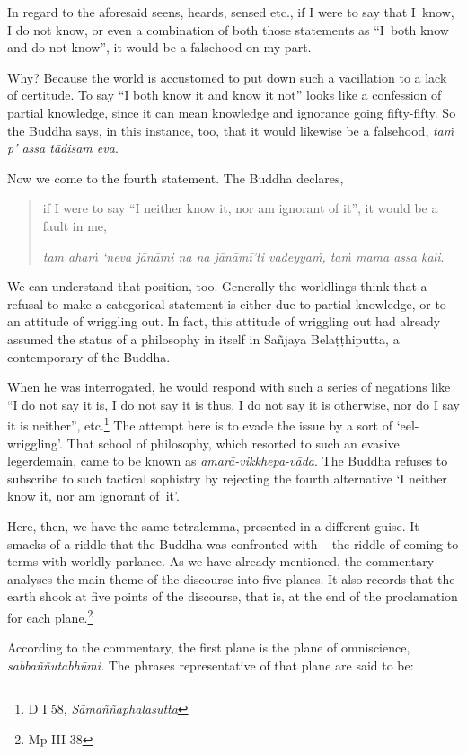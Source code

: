 In regard to the aforesaid seens, heards, sensed etc., if I were to say that I~know, I do not know, or even a combination of both those statements as ``I~both know and do not know'', it would be a falsehood on my part.

Why? Because the world is accustomed to put down such a vacillation to a lack of certitude. To say ``I both know it and know it not'' looks like a confession of partial knowledge, since it can mean knowledge and ignorance going fifty-fifty. So the Buddha says, in this instance, too, that it would likewise be a falsehood, \emph{taṁ p' assa tādisam eva}.

Now we come to the fourth statement. The Buddha declares,

\begin{quote}
if I were to say ``I neither know it, nor am ignorant of it'', it would be a fault in me,

\emph{tam ahaṁ `neva jānāmi na na jānāmī'ti vadeyyaṁ, taṁ mama assa kali}.
\end{quote}

We can understand that position, too. Generally the worldlings think that a refusal to make a categorical statement is either due to partial knowledge, or to an attitude of wriggling out. In fact, this attitude of wriggling out had already assumed the status of a philosophy in itself in Sañjaya Belaṭṭhiputta, a contemporary of the Buddha.

When he was interrogated, he would respond with such a series of negations like ``I do not say it is, I do not say it is thus, I do not say it is otherwise, nor do I say it is neither'', etc.\footnote{D I 58, \emph{Sāmaññaphalasutta}} The attempt here is to evade the issue by a sort of `eel-wriggling'. That school of philosophy, which resorted to such an evasive legerdemain, came to be known as \emph{amarā-vikkhepa-vāda}. The Buddha refuses to subscribe to such tactical sophistry by rejecting the fourth alternative `I neither know it, nor am ignorant of~it'.

Here, then, we have the same tetralemma, presented in a different guise. It smacks of a riddle that the Buddha was confronted with -- the riddle of coming to terms with worldly parlance. As we have already mentioned, the commentary analyses the main theme of the discourse into five planes. It also records that the earth shook at five points of the discourse, that is, at the end of the proclamation for each plane.\footnote{Mp III 38}

According to the commentary, the first plane is the plane of omniscience, \emph{sabbaññutabhūmi}. The phrases representative of that plane are said to be:


